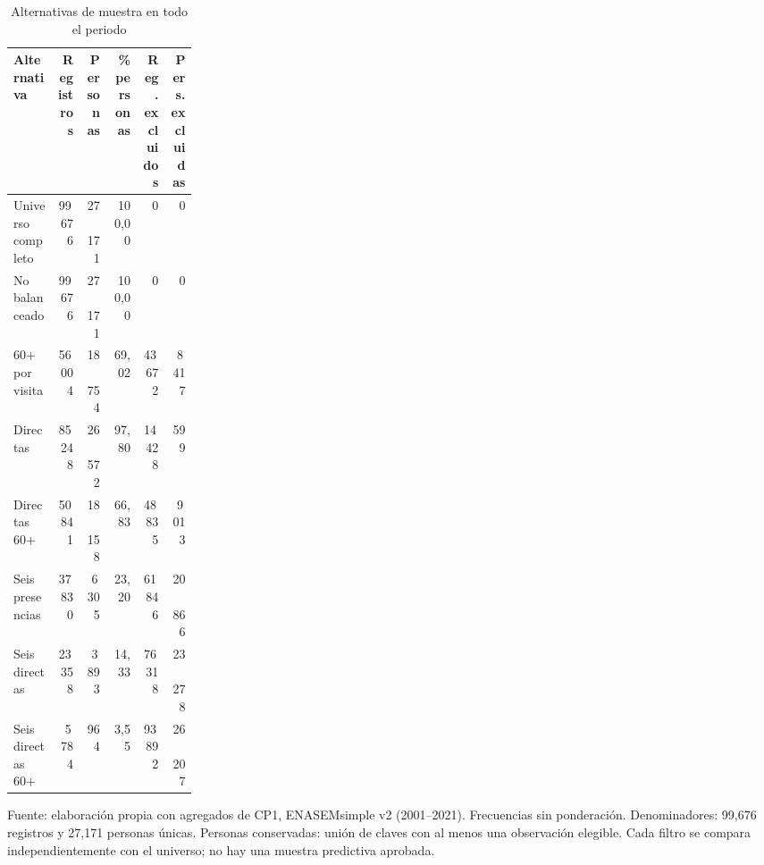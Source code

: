 \begin{table}[!htbp]
\centering
\caption{Alternativas de muestra en todo el periodo}\label{tab:cp1-muestras}
\small\setlength{\tabcolsep}{4pt}
\renewcommand{\arraystretch}{1.15}
\begin{tabular}{p{0.24\linewidth}rrrrr}
\toprule
\textbf{Alternativa} & \textbf{Registros} & \textbf{Personas} & \textbf{\% personas} & \shortstack[c]{\textbf{Reg.}\\\textbf{excluidos}} & \shortstack[c]{\textbf{Pers.}\\\textbf{excluidas}} \\
\midrule
Universo completo & 99\,676 & 27\,171 & 100,00 & 0 & 0 \\
No balanceado & 99\,676 & 27\,171 & 100,00 & 0 & 0 \\
60+ por visita & 56\,004 & 18\,754 & 69,02 & 43\,672 & 8\,417 \\
Directas & 85\,248 & 26\,572 & 97,80 & 14\,428 & 599 \\
Directas 60+ & 50\,841 & 18\,158 & 66,83 & 48\,835 & 9\,013 \\
Seis presencias & 37\,830 & 6\,305 & 23,20 & 61\,846 & 20\,866 \\
Seis directas & 23\,358 & 3\,893 & 14,33 & 76\,318 & 23\,278 \\
Seis directas 60+ & 5\,784 & 964 & 3,55 & 93\,892 & 26\,207 \\
\bottomrule
\end{tabular}
\par\medskip
\parbox{\linewidth}{\footnotesize Fuente: elaboración propia con agregados de CP1, ENASEMsimple v2 (2001--2021). Frecuencias sin ponderación. Denominadores: 99,676 registros y 27,171 personas únicas. Personas conservadas: unión de claves con al menos una observación elegible. Cada filtro se compara independientemente con el universo; no hay una muestra predictiva aprobada.}
\end{table}
